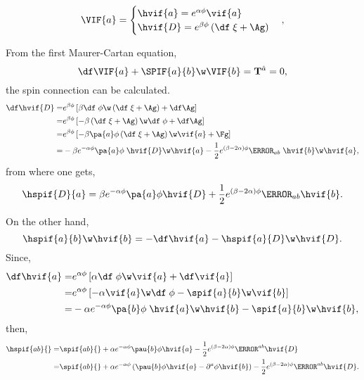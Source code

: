 \begin{equation}
  \VIF{a} = 
  \begin{cases}
    \hvif{a} = e^{\alpha\phi} \vif{a}\\
    \hvif{D} = e^{\beta\phi}\left(\df\;\xi +\Ag \right)
  \end{cases},
\end{equation}

From the first Maurer-Cartan equation,
\begin{equation}
  \df\VIF{a} + \SPIF{a}{b}\w\VIF{b} = {\bf{T}}^{\hat{a}} = 0,
\end{equation}
the spin connection can be calculated.
\begin{align}
  \df\hvif{D} =& e^{\beta\phi}\left[\beta\df\;\phi\w\left(\df\;\xi +\Ag \right) + \df\Ag\right]\nonumber\\
  =& e^{\beta\phi}\left[-\beta\left(\df\;\xi +\Ag \right)\w\df\;\phi + \df\Ag\right]\nonumber\\
  =& e^{\beta\phi}\left[-\beta\pa{a}\phi\left(\df\;\xi +\Ag \right)\w\vif{a} + \Fg\right]\nonumber\\
  =& -\beta e^{-\alpha\phi}\pa{a}\phi\;\hvif{D}\w\hvif{a} -\frac{1}{2}e^{(\beta-2\alpha)\phi}\F_{a b}\;\hvif{b}\w\hvif{a},
\end{align}
from where one gets,
\begin{equation}
  \hspif{D}{a} = \beta e^{-\alpha\phi}\pa{a}\phi\hvif{D} + \frac{1}{2}e^{(\beta-2\alpha)\phi}\F_{a b}\hvif{b}.
\end{equation}

On the other hand,
\begin{equation}
  \hspif{a}{b}\w\hvif{b} = -\df\hvif{a} - \hspif{a}{D}\w\hvif{D}.
\end{equation}
Since,
\begin{align}
  \df\hvif{a} 
  =& e^{\alpha\phi}\left[\alpha\df\;\phi\w\vif{a} +  \df\vif{a}\right]\nonumber\\
  =& e^{\alpha\phi}\left[-\alpha\vif{a}\w\df\;\phi -  \spif{a}{b}\w\vif{b}\right]\nonumber\\
  =& -\alpha e^{-\alpha\phi}\pa{b}\phi\;\hvif{a}\w\hvif{b} - \spif{a}{b}\w\hvif{b},
\end{align}
then,
\begin{align}
  \hspif{ab}{} =& \spif{ab}{} + \alpha e^{-\alpha\phi}\pau{b}\phi\hvif{a} - \frac{1}{2}e^{(\beta-2\alpha)\phi}\F^{a b}\hvif{D}\nonumber\\
  =& \spif{ab}{} + \alpha e^{-\alpha\phi}\left(\pau{b}\phi\hvif{a} - \partial^{a}\phi\hvif{b}\right) - \frac{1}{2}e^{(\beta-2\alpha)\phi}\F^{a b}\hvif{D}.
\end{align}

